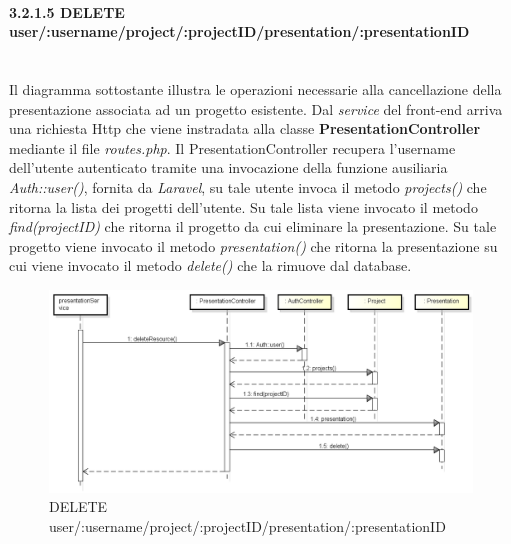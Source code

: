 \paragraph{3.2.1.5 DELETE user/:username/project/:projectID/presentation/:presentationID}\mbox{}\\
Il diagramma sottostante illustra le operazioni necessarie alla cancellazione della presentazione associata ad un progetto esistente. Dal \textit{service} del front-end arriva una richiesta Http che viene instradata alla classe \textbf{PresentationController} mediante il file \textit{routes.php}. Il PresentationController recupera l'username dell'utente autenticato tramite una invocazione della funzione ausiliaria \textit{Auth::user()}, fornita da \textit{Laravel}, su tale utente invoca il metodo \textit{projects()} che ritorna la lista dei progetti dell'utente. Su tale lista viene invocato il metodo \textit{find(projectID)} che ritorna il progetto da cui eliminare la presentazione. Su tale progetto viene invocato il metodo \textit{presentation()} che ritorna la presentazione su cui viene invocato il metodo \textit{delete()} che la rimuove dal database.

\begin{figure}[h]
	\centering
	\includegraphics[width=0.6\linewidth]{img/DELETEpresentation}
	\caption[DELETE user/:username/project/:projectID/presentation/:presentationID]{DELETE user/:username/project/:projectID/presentation/:presentationID}
	\label{fig:DELETE user/:username/project/:projectID/presentation/presentationID}
\end{figure}
